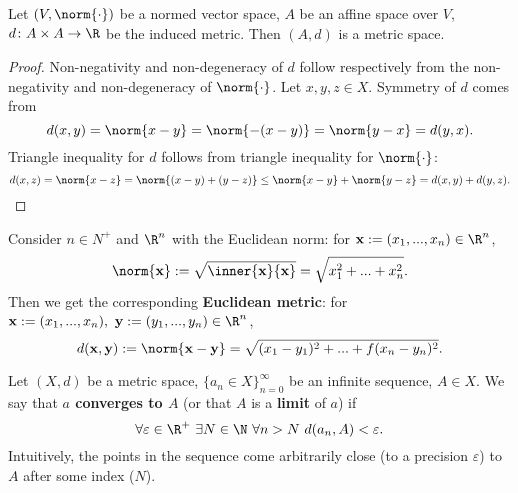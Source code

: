 \begin{proposition}
  Let
    $(V, \norm{\cdot})$ be a normed vector space,
    $A$ be an affine space over $V$,
    $d \colon A \times A \to \R$ be the induced metric.
  Then $(A, d)$ is a metric space.
\end{proposition}
\begin{proof}
  Non-negativity and non-degeneracy of $d$ follow respectively from
  the non-negativity and non-degeneracy of $\norm{\cdot}$.
  Let $x, y, z \in X$.
  Symmetry of $d$ comes from
  \begin{equation}
    d(x, y) = \norm{x - y} = \norm{- (x - y)} = \norm{y - x} = d(y, x).
  \end{equation}
  Triangle inequality for $d$ follows from triangle inequality for
  $\norm{\cdot}$:
  \begin{equation}
    d(x, z)
    = \norm{x - z}
    = \norm{(x - y) + (y - z)}
    \leq \norm{x - y} + \norm{y - z}
    = d(x, y) + d(y, z).
  \end{equation}
\end{proof}
\begin{example}
  Consider $n \in N^+$ and $\R^n$ with the Euclidean norm:
  for ${\bf x} := (x_1, ..., x_n) \in \R^n$,
  \begin{equation}
    \norm{\bf x}
    := \sqrt{\inner{\bf x}{\bf x}}
    = \sqrt{x_1^2 + ... + x_n^2}.
  \end{equation}
  Then we get the corresponding \textbf{Euclidean metric}:
  for ${\bf x} := (x_1, ..., x_n),\ {\bf y} := (y_1, ..., y_n) \in \R^n$,
  \begin{equation}
    d({\bf x}, {\bf y})
    := \norm{{\bf x} - {\bf y}}
    = \sqrt{(x_1 - y_1)^2 + ... +f (x_n - y_n)^2}.
  \end{equation}
\end{example}
\begin{definition}
  Let
    $(X, d)$ be a metric space,
    $\{a_n \in X\}_{n = 0}^\infty$ be an infinite sequence,
    $A \in X$.
  We say that \textbf{$a$ converges to $A$}
  (or that $A$ is a \textbf{limit} of $a$) if
  \begin{equation}
    \forall \varepsilon \in \R^+\
      \exists N \in \N\
        \forall n > N\
          d(a_n, A) < \varepsilon.
  \end{equation}
  Intuitively, the points in the sequence come arbitrarily close
  (to a precision $\varepsilon$) to $A$ after some index ($N$).
\end{definition}
